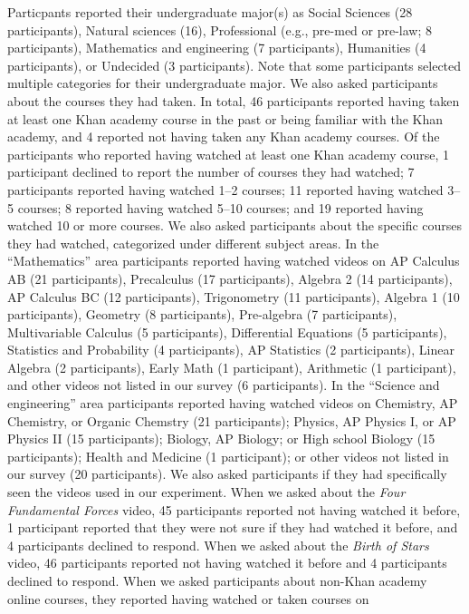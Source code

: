 \documentclass[10pt]{article}
\begin{document}
Particpants reported their undergraduate major(s) as Social Sciences (28
participants), Natural sciences (16), Professional (e.g., pre-med or pre-law; 8
participants), Mathematics and engineering (7 participants), Humanities (4
participants), or Undecided (3 participants). Note that some participants
selected multiple categories for their undergraduate major. We also asked
participants about the courses they had taken. In total, 46 participants
reported having taken at least one Khan academy course in the past or being
familiar with the Khan academy, and 4 reported not having taken any Khan
academy courses. Of the participants who reported having watched at least one
Khan academy course, 1 participant declined to report the number of courses
they had watched; 7 participants reported having watched 1--2 courses; 11
reported having watched 3--5 courses; 8 reported having watched 5--10 courses;
and 19 reported having watched 10 or more courses. We also asked participants
about the specific courses they had watched, categorized under different
subject areas. In the ``Mathematics'' area participants reported having watched
videos on AP Calculus AB (21 participants), Precalculus (17 participants),
Algebra 2 (14 participants), AP Calculus BC (12 participants), Trigonometry (11
participants), Algebra 1 (10 participants), Geometry (8 participants),
Pre-algebra (7 participants), Multivariable Calculus (5 participants),
Differential Equations (5 participants), Statistics and Probability (4
participants), AP Statistics (2 participants), Linear Algebra (2 participants),
Early Math (1 participant), Arithmetic (1 participant), and other videos not
listed in our survey (6 participants). In the ``Science and engineering'' area
participants reported having watched videos on Chemistry, AP Chemistry, or
Organic Chemstry (21 participants); Physics, AP Physics I, or AP Physics II (15
participants); Biology, AP Biology; or High school Biology (15 participants);
Health and Medicine (1 participant); or other videos not listed in our survey
(20 participants). We also asked participants if they had specifically seen the
videos used in our experiment. When we asked about the \textit{Four Fundamental
Forces} video, 45 participants reported not having watched it before, 1
participant reported that they were not sure if they had watched it before, and
4 participants declined to respond. When we asked about the \textit{Birth of
Stars} video, 46 participants reported not having watched it before and 4
participants declined to respond. When we asked participants about non-Khan
academy online courses, they reported having watched or taken courses on
\end{document}
